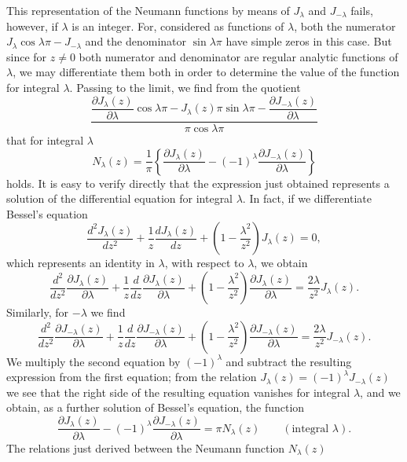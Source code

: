 This representation of the Neumann functions by means of $J_\lambda$ and $J_{-\lambda}$ fails, however, if $\lambda$ is an integer. For, considered as functions of $\lambda$, both the numerator $J_\lambda\cos\lambda\pi-J_{-\lambda}$ and the denominator $\sin\lambda\pi$ have simple zeros in this case. But since for $z\ne0$ both numerator and denominator are regular analytic functions of $\lambda$, we may differentiate them both in order to determine the value of the function for integral $\lambda$. Passing to the limit, we find from the quotient
\[
\frac{\dfrac{\partial J_\lambda(z)}{\partial\lambda}\cos\lambda\pi
-J_\lambda(z)\pi\sin\lambda\pi
-\dfrac{\partial J_{-\lambda}(z)}{\partial\lambda}}
{\pi\cos\lambda\pi}
\]
that for integral $\lambda$
\begin{equation}\tag{40}
N_\lambda(z)=\frac1\pi\left\{\frac{\partial J_\lambda(z)}{\partial\lambda}
-(-1)^\lambda\frac{\partial J_{-\lambda}(z)}{\partial\lambda}\right\}
\end{equation}
holds. It is easy to verify directly that the expression just obtained represents a solution of the differential equation for integral $\lambda$. In fact, if we differentiate Bessel's equation
\[
\frac{d^2J_\lambda(z)}{dz^2}+\frac1z\frac{dJ_\lambda(z)}{dz}
+\left(1-\frac{\lambda^2}{z^2}\right)J_\lambda(z)=0,
\]
which represents an identity in $\lambda$, with respect to $\lambda$, we obtain
\[
\frac{d^2}{dz^2}\frac{\partial J_\lambda(z)}{\partial\lambda}
+\frac1z\frac d{dz}\frac{\partial J_\lambda(z)}{\partial\lambda}
+\left(1-\frac{\lambda^2}{z^2}\right)\frac{\partial J_\lambda(z)}{\partial\lambda}
=\frac{2\lambda}{z^2}J_\lambda(z).
\]
Similarly, for $-\lambda$ we find
\[
\frac{d^2}{dz^2}\frac{\partial J_{-\lambda}(z)}{\partial\lambda}
+\frac1z\frac d{dz}\frac{\partial J_{-\lambda}(z)}{\partial\lambda}
+\left(1-\frac{\lambda^2}{z^2}\right)\frac{\partial J_{-\lambda}(z)}{\partial\lambda}
=\frac{2\lambda}{z^2}J_{-\lambda}(z).
\]
We multiply the second equation by $(-1)^\lambda$ and subtract the resulting expression from the first equation; from the relation $J_\lambda(z)=(-1)^\lambda J_{-\lambda}(z)$ we see that the right side of the resulting equation vanishes for integral $\lambda$, and we obtain, as a further solution of Bessel's equation, the function
\[
\frac{\partial J_\lambda(z)}{\partial\lambda}
-(-1)^\lambda\frac{\partial J_{-\lambda}(z)}{\partial\lambda}
=\pi N_\lambda(z)\qquad(\text{integral }\lambda).
\]
The relations just derived between the Neumann function $N_\lambda(z)$

